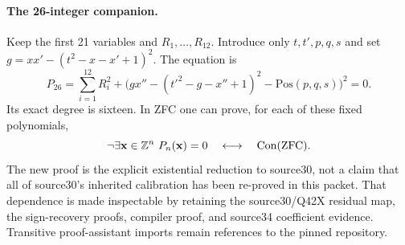 \paragraph{The 26-integer companion.}
Keep the first 21 variables and $R_1,\ldots,R_{12}$. Introduce only
$t,t',p,q,s$ and set $g=xx'-(t^2-x-x'+1)^2$. The equation is
\[
 \boxed{\quad P_{26}=\sum_{i=1}^{12}R_i^2+
 \bigl(gx''-(t'^2-g-x''+1)^2-\mathrm{Pos}(p,q,s)\bigr)^2=0.\quad}
\]
Its exact degree is sixteen. In ZFC one can prove, for each of these
fixed polynomials,
\[
 \neg\exists\mathbf x\in\mathbb Z^n\ P_n(\mathbf x)=0
 \quad\longleftrightarrow\quad\operatorname{Con}(\mathrm{ZFC}).
\]
The new proof is the explicit existential reduction to source30, not a
claim that all of source30's inherited calibration has been re-proved
in this packet. That dependence is made inspectable by retaining the
source30/Q42X residual map, the sign-recovery proofs, compiler proof,
and source34 coefficient evidence. Transitive proof-assistant imports
remain references to the pinned repository.

